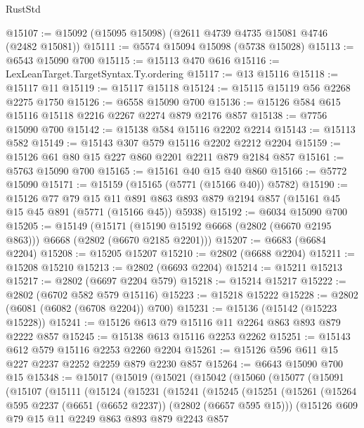 \begin{lexlean}{RustStd}
\begin{coremodule}
@15107 := @15092 (@15095 @15098) (@2611 @4739 @4735 @15081 @4746 (@2482 @15081))
@15111 := @5574 @15094 @15098 (@5738 @15028)
@15113 := @6543 @15090 @700
@15115 := @15113 @470 @616
@15116 := LexLeanTarget.TargetSyntax.Ty.ordering
@15117 := @13 @15116
@15118 := @15117 @11
@15119 := @15117 @15118
@15124 := @15115 @15119 @56 @2268 @2275 @1750
@15126 := @6558 @15090 @700
@15136 := @15126 @584 @615 @15116 @15118 @2216 @2267 @2274 @879 @2176 @857
@15138 := @7756 @15090 @700
@15142 := @15138 @584 @15116 @2202 @2214
@15143 := @15113 @582
@15149 := @15143 @307 @579 @15116 @2202 @2212 @2204
@15159 := @15126 @61 @80 @15 @227 @860 @2201 @2211 @879 @2184 @857
@15161 := @5763 @15090 @700
@15165 := @15161 @40 @15 @40 @860
@15166 := @5772 @15090
@15171 := @15159 (@15165 (@5771 (@15166 @40)) @5782)
@15190 := @15126
    @77
    @79
    @15
    @11
    @891
    @863
    @893
    @879
    @2194
    @857
    (@15161 @45 @15 @45 @891 (@5771 (@15166 @45)) @5938)
@15192 := @6034 @15090 @700
@15205 := @15149
    (@15171 (@15190 @15192 @6668 (@2802 (@6670 @2195 @863))) @6668 (@2802 (@6670 @2185 @2201)))
@15207 := @6683 (@6684 @2204)
@15208 := @15205 @15207
@15210 := @2802 (@6688 @2204)
@15211 := @15208 @15210
@15213 := @2802 (@6693 @2204)
@15214 := @15211 @15213
@15217 := @2802 (@6697 @2204 @579)
@15218 := @15214 @15217
@15222 := @2802 (@6702 @582 @579 @15116)
@15223 := @15218 @15222
@15228 := @2802 (@6081 (@6082 (@6708 @2204)) @700)
@15231 := @15136 (@15142 (@15223 @15228))
@15241 := @15126 @613 @79 @15116 @11 @2264 @863 @893 @879 @2222 @857
@15245 := @15138 @613 @15116 @2253 @2262
@15251 := @15143 @612 @579 @15116 @2253 @2260 @2204
@15261 := @15126 @596 @611 @15 @227 @2237 @2252 @2259 @879 @2230 @857
@15264 := @6643 @15090 @700 @15
@15348 := @15017
    (@15019
      (@15021
        (@15042
          (@15060
            (@15077
              (@15091
                (@15107
                  (@15111
                    (@15124
                      (@15231
                        (@15241
                          (@15245
                            (@15251
                              (@15261
                                (@15264 @595 @2237 (@6651 (@6652 @2237)) (@2802 (@6657 @595 @15)))
                                (@15126
                                  @609
                                  @79
                                  @15
                                  @11
                                  @2249
                                  @863
                                  @893
                                  @879
                                  @2243
                                  @857

\end{coremodule}
\end{lexlean}
